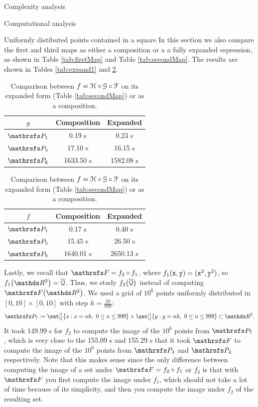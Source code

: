 \documentclass[11pt, a4paper, english, twoside, notitlepage, openright]{report}
\begin{document}
\begin{chapter}{Complexity analysis}
\begin{section}{Computational analysis}
\begin{subsection}{Uniformly distibuted points contained in a square}
In this section we also compare the first and third maps as either a composition or a a fully expanded espression, as shown in Table \ref{tab:firstMap} and Table \ref{tab:secondMap}. The results are shown in Tables \ref{tab:expand1} and \ref{tab:expand2}.

\begin{table}[ht!]
\parbox{.45\linewidth}{
\centering
\begin{tabular}{c || c | c }
$g$ & Composition &Expanded \\ \hline \hline
$\PP_1$&0.19 s&0.23 s \\ \hline
$\PP_5$ & 17.10 s&16.15 s \\ \hline
$\PP_6$ &1633.50 s &1582.08 s \\
\end{tabular}
\caption[Comparison between $g$ on its expanded form or as a composition.]{Comparison between $g= \P\circ Q \circ H$ on its expanded form (Table \ref{tab:firstMap}) or as a composition.}\label{tab:expand1}
}
\hfill
\parbox{.45\linewidth}{
\centering
\begin{tabular}{c || c | c }
$f$ & Composition &Expanded \\ \hline \hline
$\PP_1$ & 0.17 s & 0.40 s \\ \hline
$\PP_5$ & 15.45 s & 26.50 s \\ \hline
$\PP_6$ & 1640.01 s & 2650.13 s \\
\end{tabular}
\caption[Comparison between $f$ on its expanded form or as a composition.]{Comparison between $f=\mathcal{H}\circ\mathcal{G}\circ\mathcal{F}$ on its expanded form (Table \ref{tab:secondMap}) or as a composition.}\label{tab:expand2}
}
\end{table}

Lastly, we recall that $\FFF=f_2\circ f_1$, where $f_1({\tt x},{\tt y})=({\tt x}^2,{\tt y}^2)$, so $f_1\big(\R^2\big) =\overline{\Qu}$. Thus, we study $f_2\big(\overline{\mathcal{Q}}\big)$ instead of computing $\FFF\big(\R^2\big)$. We used a grid of $10^6$ points uniformly distributed in $[0, 10]\times[0,10]$ with step $h=\tfrac{10}{999}$:
$$
\PP_7 := \set[\big]{x: x=nh,\ 0\le n\le 999 }\times\set[\big]{y: y=nh,\ 0\le n\le 999 }\subset \R^2.
$$
It took 149.99 s for $f_2$ to compute the image of the $10^6$ points from $\PP_7$, which is very close to the 155.09 s and 155.29 s that it took $\FFF$ to compute the image of the $10^6$ points from $\PP_3$ and $\PP_4$ respectively. Note that this makes sense since the only difference between computing the image of a set under $\FFF= f_2\circ f_1$ or $f_2$ is that with $\FFF$ you first compute the image under $f_1$, which should not take a lot of time because of its simplicity, and then you compute the image under $f_2$ of the resulting set.
\end{subsection}


\end{section}
\end{chapter}
\end{document}
